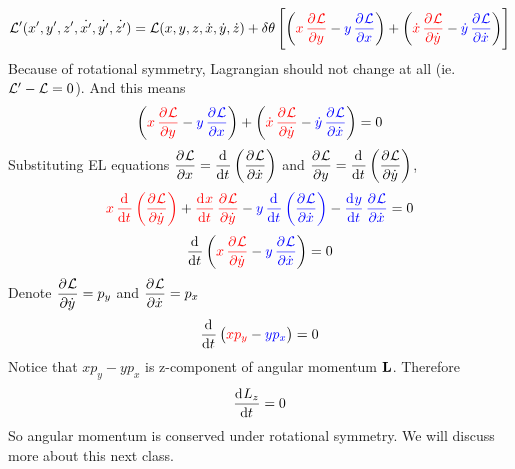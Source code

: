 \[\LL'(x',y',z',\dot{x'},\dot{y'},\dot{z'})=\LL(x,y,z,\dot{x},\dot{y},\dot{z})+\delta\theta \left[ \left( \mathbin{\textcolor{red}{x\dpd{\LL}{y}}} - \mathbin{\textcolor{blue}{y\dpd{\LL}{x}}} \right)+\left( \mathbin{\textcolor{red}{\dot{x}\dpd{\LL}{\dot{y}}}} - \mathbin{\textcolor{blue}{\dot{y}\dpd{\LL}{\dot{x}}}} \right) \right]\]
Because of rotational symmetry, Lagrangian should not change at all (ie. $\mathcal{L}'-\mathcal{L}=0$). And this means
\[\left( \mathbin{\textcolor{red}{x\dpd{\LL}{y}}} - \mathbin{\textcolor{blue}{y\dpd{\LL}{x}}} \right)+\left( \mathbin{\textcolor{red}{\dot{x}\dpd{\LL}{\dot{y}}}} - \mathbin{\textcolor{blue}{\dot{y}\dpd{\LL}{\dot{x}}}} \right)=0\]
Substituting EL equations $\dpd{\LL}{x}=\dod{}{t}\left(\dpd{\LL}{\dot{x}}\right)$ and $\dpd{\LL}{y}=\dod{}{t}\left(\dpd{\LL}{\dot{y}}\right)$,
\[ \mathbin{\textcolor{red}{x\dod{}{t}\left(\dpd{\LL}{\dot{y}}\right)}} + \mathbin{\textcolor{red}{\dod{x}{t}\dpd{\LL}{\dot{y}}}} - \mathbin{\textcolor{blue}{y\dod{}{t}\left(\dpd{\LL}{\dot{x}}\right)}} - \mathbin{\textcolor{blue}{\dod{y}{t}\dpd{\LL}{\dot{x}}}}=0\]
\[ \dod{}{t}\left( \mathbin{\textcolor{red}{x\dpd{\LL}{\dot{y}}}} - \mathbin{\textcolor{blue}{y\dpd{\LL}{\dot{x}}}} \right)=0\]
Denote $\dpd{\LL}{\dot{y}}=p_y$ and $\dpd{\LL}{\dot{x}}=p_x$
\[ \dod{}{t}\left( \mathbin{\textcolor{red}{xp_y}} - \mathbin{\textcolor{blue}{yp_x}} \right)=0\]
Notice that $xp_y-yp_x$ is z-component of angular momentum $\mathbf{L}$. Therefore
\[ \dod{L_z}{t}=0\]
So angular momentum is conserved under rotational symmetry. We will discuss more about this next class.